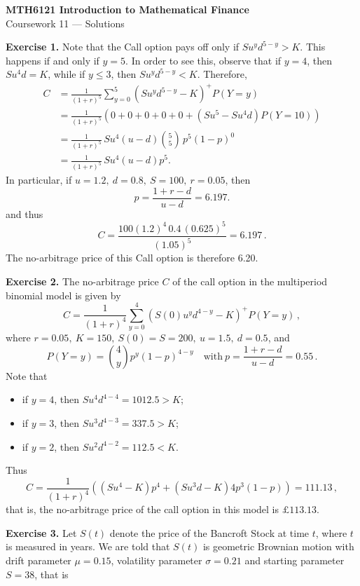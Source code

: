 \documentclass[11pt,a4paper]{article}
\begin{document}
    \begin{center}
        \LARGE\textbf{MTH6121 Introduction to Mathematical Finance}\\
        Coursework 11 — Solutions
    \end{center}
    \textbf{Exercise 1.} Note that the Call option pays off only if $Su^yd^{5-y}>K$. This happens if and only if $y = 5$. In order to see this, observe that if $y = 4$, then $Su^4d = K$, while if $y \leq 3$, then $Su^yd^{5-y}<K$.
    \hspace*{0.5cm} Therefore,
    \begin{align*}
        C
        &= \frac{1}{(1+r)^5}\sum_{y=0}^5(Su^yd^{5-y}-K)^+P(Y=y)\\
        &= \frac{1}{(1+r)^5}\left(0+0+0+0+0+(Su^5-Su^4d)P(Y=10)\right)\\
        &= \frac{1}{(1+r)^5}\, Su^4(u-d)\binom{5}{5}\, p^5(1-p)^0\\
        &= \frac{1}{(1+r)^5}\, Su^4(u-d)p^5.
    \end{align*}
    In particular, if $u = 1.2,\ d = 0.8,\ S = 100,\ r = 0.05$, then
    $$
    p = \frac{1+r-d}{u-d} = 6.197.
    $$
    and thus
    $$
    C = \frac{100(1.2)^4\, 0.4\, (0.625)^5}{(1.05)^5} = 6.197\, .
    $$
    The no-arbitrage price of this Call option is therefore 6.20.\par 
    \textbf{Exercise 2.} The no-arbitrage price $C$ of the call option in the multiperiod binomial model is given by
    $$
    C = \frac{1}{(1+r)^4}\sum_{y=0}^4(S(0)u^yd^{4-y}-K)^+P(Y=y)\, ,
    $$
    where $r = 0.05,\ K = 150,\ S(0) = S = 200,\ u = 1.5,\ d = 0.5$, and
    $$
    P(Y=y) = \binom{4}{y}p^y(1-p)^{4-y} \quad \text{with}\ p = \frac{1+r-d}{u-d}= 0.55\, . 
    $$
    Note that
    \begin{itemize}
        \item if $y = 4$, then $Su^4d^{4-4}=1012.5>K$;
        \item if $y = 3$, then $Su^3d^{4−3} = 337.5 > K$;
        \item if $y = 2$, then $Su^2d^{4−2} = 112.5 < K$.
    \end{itemize}
    Thus
    $$
    C = \frac{1}{(1+r)^4}\left((Su^4-K)p^4+(Su^3d-K)4p^3(1-p)\right)= 111.13\, ,
    $$
    that is, the no-arbitrage price of the call option in this model is $\pounds 113.13$.\par 
    \textbf{Exercise 3.} Let $S(t)$ denote the price of the Bancroft Stock at time $t$, where $t$ is measured in years. We are told that $S(t)$ is geometric Brownian motion with drift parameter $\mu = 0.15$, volatility parameter $\sigma = 0.21$ and starting parameter $S = 38$, that is
\end{document}
